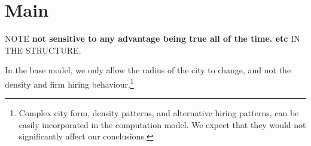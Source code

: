     


\section{Main}



NOTE \textbf{not sensitive to any advantage being true all of the time. etc } IN THE STRUCTURE.


In the base model, we only allow the radius of the city to change, and not the density and firm hiring behaviour.\footnote{Complex city form, density patterns, and alternative hiring patterns, can be easily incorporated in the computation model. We expect that they would not significantly affect our conclusions.}  

